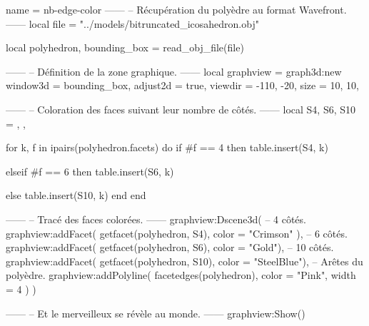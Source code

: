 \documentclass{standalone}
\begin{document}
\begin{luadraw}{name = nb-edge-color}
------
-- Récupération du polyèdre au format Wavefront.
------
local file = "../models/bitruncated_icosahedron.obj"

local polyhedron, bounding_box = read_obj_file(file)

------
-- Définition de la zone graphique.
------
local graphview = graph3d:new{
  window3d = bounding_box,
  adjust2d = true,
  viewdir  = {-110, -20},
  size     = {10, 10},
}

------
-- Coloration des faces suivant leur nombre de côtés.
------
local S4, S6, S10 = {}, {}, {}

for k, f in ipairs(polyhedron.facets) do
  if #f == 4 then
    table.insert(S4, k)

  elseif #f == 6 then
    table.insert(S6, k)

  else
    table.insert(S10, k)
  end
end

------
-- Tracé des faces colorées.
------
graphview:Dscene3d(
-- 4 côtés.
  graphview:addFacet(
    getfacet(polyhedron, S4),
    {
      color = "Crimson"
    }),
-- 6 côtés.
  graphview:addFacet(
    getfacet(polyhedron, S6),
    {color = "Gold"}),
-- 10 côtés.
  graphview:addFacet(
    getfacet(polyhedron, S10),
    {color = "SteelBlue"}),
-- Arêtes du polyèdre.
  graphview:addPolyline(
    facetedges(polyhedron),
    {
      color = "Pink",
      width = 4
    })
)

------
-- Et le merveilleux se révèle au monde.
------
graphview:Show()
\end{luadraw}
\end{document}
